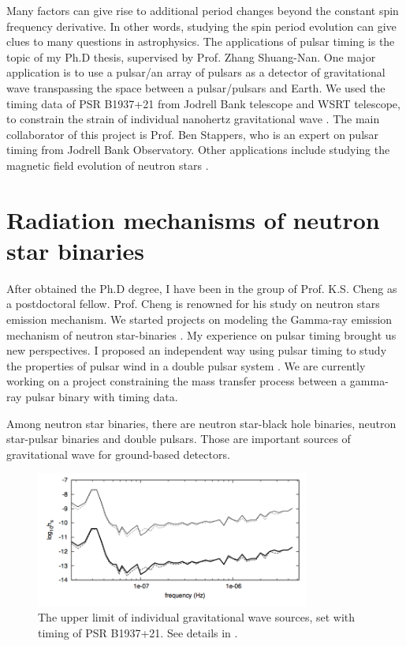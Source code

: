\documentclass{article}
\begin{document}
Many factors can give rise to additional period changes beyond the constant spin frequency derivative. In other words, studying the spin period evolution can give clues to many questions in astrophysics. The applications of pulsar timing is the topic of my Ph.D thesis, supervised by Prof. Zhang Shuang-Nan. One major application is to use a pulsar/an array of pulsars as a detector of gravitational wave transpassing the space between a pulsar/pulsars and Earth. We used the timing data of PSR B1937+21 from Jodrell Bank telescope and WSRT telescope, to constrain the strain of individual nanohertz gravitational wave \citep{2014MNRAS.445.1245Y}. The main collaborator of this project is Prof. Ben Stappers, who is an expert on pulsar timing from Jodrell Bank Observatory. Other applications include studying the magnetic field evolution of neutron stars \citep{2015MNRAS.454.3674Y}. 

\section{Radiation mechanisms of neutron star binaries}
After obtained the Ph.D degree, I have been in the group of Prof. K.S. Cheng as a postdoctoral fellow. Prof. Cheng is renowned for his study on neutron stars emission mechanism. We started projects on modeling the Gamma-ray emission mechanism of neutron star-binaries \citep{2017ApJ...844..114Y, 2017arXiv170708263Y}. My experience on pulsar timing brought us new perspectives. I proposed an independent way using pulsar timing to study the properties of pulsar wind in a double pulsar system \citep{c}. We are currently working on a project constraining the mass transfer process between a gamma-ray pulsar binary with timing data. 

Among neutron star binaries, there are neutron star-black hole binaries, neutron star-pulsar binaries and double pulsars. Those are important sources of gravitational wave for ground-based detectors. 

\hspace*{- 4 cm}
\begin{figure}[t]
\centering
\includegraphics[width =9cm, trim=0 0 2.9cm 0cm]{GWlimit.png}
\caption{The upper limit of individual gravitational wave sources, set with timing of PSR B1937+21. See details in \citep{2014MNRAS.445.1245Y}.}
\end{figure}
\hspace*{- 4 cm}
\end{document}
